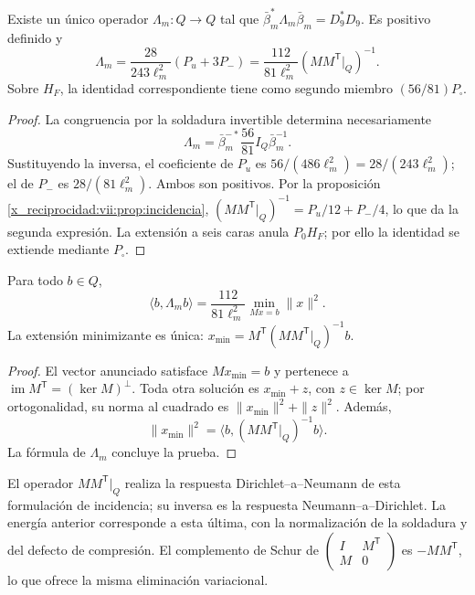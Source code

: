 \begin{theorem}
\label{x_reciprocidad:vii:thm:respuesta-unica}
Existe un único operador \(\Lambda_m:Q\longrightarrow Q\) tal que
\(\bar\beta_m^*\Lambda_m\bar\beta_m=D_9^*D_9\). Es positivo definido y
\begin{equation}
 \Lambda_m=\frac{28}{243\ell_m^2}(P_u+3P_-)
 =\frac{112}{81\ell_m^2}
       (MM^{\mathsf T}|_Q)^{-1}.
 \label{x_reciprocidad:vii:eq:lambda-pantalla}
\end{equation}
Sobre \(H_F\), la identidad correspondiente tiene como segundo miembro
\((56/81)P_\square\).
\end{theorem}

\begin{proof}
La congruencia por la soldadura invertible determina necesariamente
\[
 \Lambda_m=\bar\beta_m^{-*}\frac{56}{81}I_Q\bar\beta_m^{-1}.
\]
Sustituyendo la inversa, el coeficiente de \(P_u\) es
\(56/(486\ell_m^2)=28/(243\ell_m^2)\); el de \(P_-\) es
\(28/(81\ell_m^2)\). Ambos son positivos. Por la
proposición \ref{x_reciprocidad:vii:prop:incidencia},
\((MM^{\mathsf T}|_Q)^{-1}=P_u/12+P_-/4\),
lo que da la segunda expresión. La extensión a seis caras anula
\(P_0H_F\); por ello la identidad se extiende mediante \(P_\square\).
\end{proof}

\begin{proposition}
\label{x_reciprocidad:vii:prop:minima-extension}
Para todo \(b\in Q\),
\[
 \langle b,\Lambda_m b\rangle
 =\frac{112}{81\ell_m^2}
   \min_{Mx=b}\|x\|^2.
\]
La extensión minimizante es única:
\(x_{\min}=M^{\mathsf T}(MM^{\mathsf T}|_Q)^{-1}b\).
\end{proposition}

\begin{proof}
El vector anunciado satisface \(Mx_{\min}=b\) y pertenece a
\(\operatorname{im}M^{\mathsf T}=(\ker M)^\perp\).
Toda otra solución es \(x_{\min}+z\), con \(z\in\ker M\); por
ortogonalidad, su norma al cuadrado es \(\|x_{\min}\|^2+\|z\|^2\).
Además,
\[
 \|x_{\min}\|^2
 =\langle b,(MM^{\mathsf T}|_Q)^{-1}b\rangle.
\]
La fórmula de \(\Lambda_m\) concluye la prueba.
\end{proof}

El operador \(MM^{\mathsf T}|_Q\) realiza la respuesta
Dirichlet--a--Neumann de esta formulación de incidencia; su inversa
es la respuesta Neumann--a--Dirichlet. La energía anterior corresponde
a esta última, con la normalización de la soldadura y del defecto de
compresión. El complemento de Schur de
\(\left(\begin{smallmatrix}I&M^{\mathsf T}\\M&0\end{smallmatrix}\right)\)
es \(-MM^{\mathsf T}\), lo que ofrece la misma eliminación variacional.

